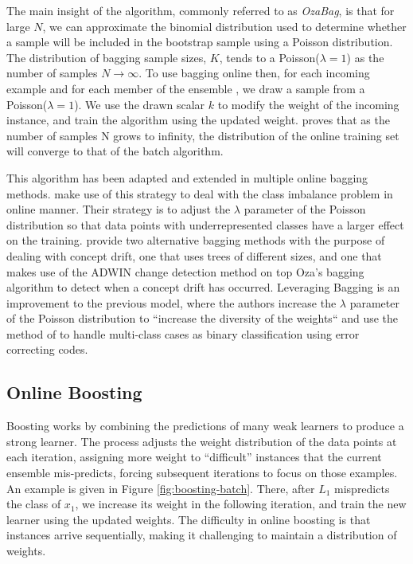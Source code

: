 The main insight of the algorithm, commonly referred to as \emph{OzaBag}, is that for large $N$, we can approximate the binomial distribution
used to determine whether a sample will be included in the bootstrap
sample using a Poisson distribution. The distribution of bagging sample sizes, $K$, tends
to a Poisson($\lambda = 1$) as the number of samples $N \rightarrow \infty$. To use bagging online then,
for each incoming example and
for each member of the ensemble \ensemble, we draw a sample from a Poisson($\lambda = 1$). We use the drawn scalar $k$ to modify the weight of the incoming instance, and train the algorithm using the updated weight. \citeauthor{Oza2001online} proves that as the number of samples N grows
to infinity, the distribution of the online training set will converge to that of the batch algorithm.

This algorithm has been adapted and extended in multiple online bagging methods. \citet{online-bag-imbalance}
make use of this strategy to deal with the class imbalance problem in online manner. Their strategy
is to adjust the $\lambda$ parameter of the Poisson distribution so that data points with underrepresented
classes have a larger effect on the training. \citet{new-ensemble-methods} provide two alternative
bagging methods with the purpose of dealing with concept drift, one that uses trees of different
sizes, and one that makes use of the ADWIN \cite{adwin} change detection method on top Oza's bagging algorithm to detect when a concept drift has occurred. Leveraging Bagging \cite{leveraging-bagging} is an improvement to the previous model,
where the authors increase the $\lambda$ parameter of the Poisson distribution to ``increase the diversity of the weights`` and use the method of \citet{multiclass-codes} to handle multi-class cases
as binary classification using error correcting codes.

\subsection{Online Boosting}

Boosting works by combining the predictions of many weak learners to produce a
strong learner. The process adjusts the weight distribution of the data points
at each iteration, assigning more weight to ``difficult'' instances that the
current ensemble mis-predicts, forcing subsequent iterations to focus on those
examples. An example is given in Figure \ref{fig:boosting-batch}. There, after
$L_1$ mispredicts the class of $x_1$, we increase its weight in the following
iteration, and train the new learner using the updated weights.
The difficulty in online boosting is that
instances arrive sequentially, making it challenging to maintain a distribution
of weights.

